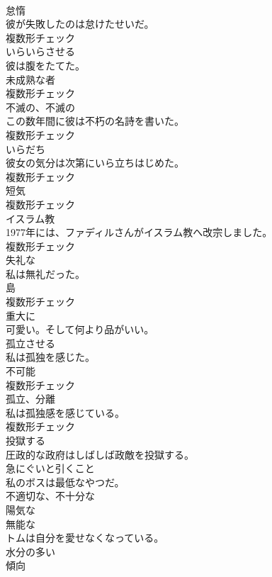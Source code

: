 \documentclass[8pt]{extreport}
\begin{document}
\begin{CJK}{UTF8}{min}
\\	[名詞]	怠惰	
\\	彼が失敗したのは怠けたせいだ。	
\\	複数形チェック
\\	[動詞]	いらいらさせる	
\\	彼は腹をたてた。	
\\	[名詞]	未成熟な者	
\\	複数形チェック
\\	[名詞]	不滅の、不滅の	
\\	この数年間に彼は不朽の名詩を書いた。	
\\	複数形チェック
\\	[名詞]	いらだち	
\\	彼女の気分は次第にいら立ちはじめた。	
\\	複数形チェック
\\	[名詞]	短気	
\\	複数形チェック
\\	[名詞]	イスラム教	
\\	1977年には、ファディルさんがイスラム教へ改宗しました。	
\\	複数形チェック
\\	[形容詞]	失礼な	
\\	私は無礼だった。	
\\	[名詞]	島	
\\	複数形チェック
\\	[副詞]	重大に	
\\	可愛い。そして何より品がいい。	
\\	[動詞]	孤立させる	
\\	私は孤独を感じた。	
\\	[名詞]	不可能	
\\	複数形チェック
\\	[名詞]	孤立、分離	
\\	私は孤独感を感じている。	
\\	複数形チェック
\\	[動詞]	投獄する	
\\	圧政的な政府はしばしば政敵を投獄する。	
\\	[動詞]	急にぐいと引くこと	
\\	私のボスは最低なやつだ。	
\\	[形容詞]	不適切な、不十分な	
\\	[形容詞]	陽気な	
\\	[形容詞]	無能な	
\\	トムは自分を愛せなくなっている。	
\\	[形容詞]	水分の多い	
\\	[名詞]	傾向	

\end{CJK}
\end{document}
